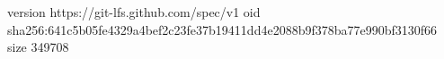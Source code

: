 version https://git-lfs.github.com/spec/v1
oid sha256:641c5b05fe4329a4bef2c23fe37b19411dd4e2088b9f378ba77e990bf3130f66
size 349708
